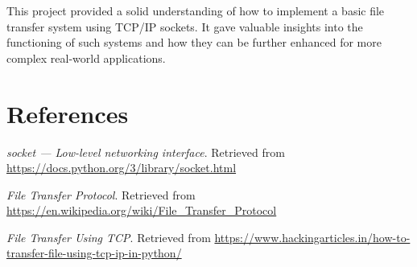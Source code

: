\documentclass{article}
\begin{document}
This project provided a solid understanding of how to implement a basic file transfer system using TCP/IP sockets. It gave valuable insights into the functioning of such systems and how they can be further enhanced for more complex real-world applications.

\section{References}

\begin{thebibliography}{99}
    
     \textit{socket — Low-level networking interface}. Retrieved from \url{https://docs.python.org/3/library/socket.html}
    
     \textit{File Transfer Protocol}. Retrieved from \url{https://en.wikipedia.org/wiki/File_Transfer_Protocol}

     \textit{File Transfer Using TCP}. Retrieved from \url{https://www.hackingarticles.in/how-to-transfer-file-using-tcp-ip-in-python/}
    

\end{thebibliography}
\end{document}
